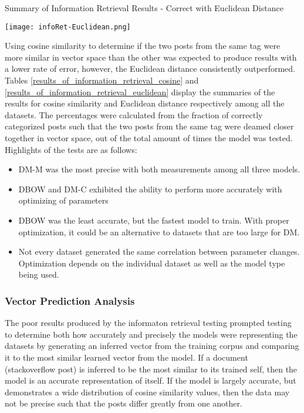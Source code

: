 \begin{table}[ht]
\caption{Summary of Information Retrieval Results - Correct with Euclidean Distance}
\label{results_of_information_retrieval_euclidean}
\centering
\texttt{[image: infoRet-Euclidean.png]}
\end{table}

Using cosine similarity to determine if the two posts from the same tag were more similar in vector space than the other was expected to produce results with a lower rate of error, however, the Euclidean distance consistently outperformed. Tables \ref{results_of_information_retrieval_cosine} and \ref{results_of_information_retrieval_euclidean} display the summaries of the results for cosine similarity and Euclidean distance respectively among all the datasets. The percentages were calculated from the fraction of correctly categorized posts such that the two posts from the same tag were deamed closer together in vector space, out of the total amount of times the model was tested. Highlights of the tests are as follows:

\begin{itemize}
  \item DM-M was the most precise with both measurements among all three models. 
  \item DBOW and DM-C exhibited the ability to perform more accurately with optimizing of parameters
  \item DBOW was the least accurate, but the fastest model to train. With proper optimization, it could be an alternative to datasets that are too large for DM.
  \item Not every dataset generated the same correlation between parameter changes. Optimization depends on the individual dataset as well as the model type being used.
\end{itemize}

\subsubsection{Vector Prediction Analysis} The poor results produced by the informaton retrieval testing prompted testing to determine both how accurately and precisely the models were representing the datasets by generating an inferred vector from the training corpus and comparing it to the most similar learned vector from the model. If a document (stackoverflow post) is inferred to be the most similar to its trained self, then the model is an accurate representation of itself. If the model is largely accurate, but demonstrates a wide distribution of cosine similarity values, then the data may not be precise such that the posts differ greatly from one another. 

